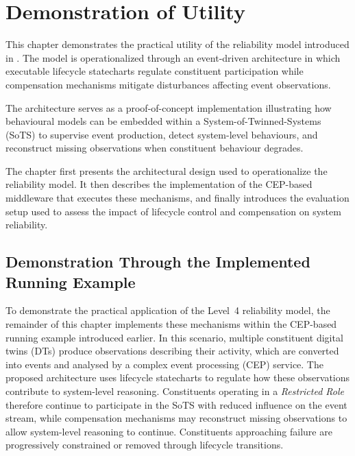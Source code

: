 










\chapter{Demonstration of Utility}\label{ch:architecture}

This chapter demonstrates the practical utility of the reliability model introduced in . The model is operationalized through an event-driven architecture in which executable lifecycle statecharts regulate constituent participation while compensation mechanisms mitigate disturbances affecting event observations.

The architecture serves as a proof-of-concept implementation illustrating how behavioural models can be embedded within a System-of-Twinned-Systems (SoTS) to supervise event production, detect system-level behaviours, and reconstruct missing observations when constituent behaviour degrades. 

The chapter first presents the architectural design used to operationalize the reliability model. It then describes the implementation of the CEP-based middleware that executes these mechanisms, and finally introduces the evaluation setup used to assess the impact of lifecycle control and compensation on system reliability.

\section{Demonstration Through the Implemented Running Example}
To demonstrate the practical application of the Level~4 reliability model, the remainder of this chapter implements these mechanisms within the CEP-based running example introduced earlier. In this scenario, multiple constituent digital twins (DTs) produce observations describing their activity, which are converted into events and analysed by a complex event processing (CEP) service. The proposed architecture uses lifecycle statecharts to regulate how these observations contribute to system-level reasoning. Constituents operating in a \textit{Restricted Role} therefore continue to participate in the SoTS with reduced influence on the event stream, while compensation mechanisms may reconstruct missing observations to allow system-level reasoning to continue. Constituents approaching failure are progressively constrained or removed through lifecycle transitions.


